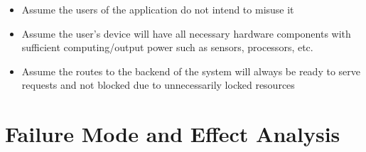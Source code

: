 \documentclass{article}
\begin{document}
\begin{itemize}
    \item Assume the users of the application do not intend to misuse it
    \item Assume the user's device will have all necessary hardware components with sufficient computing/output power such as sensors, processors, etc.
    \item Assume the routes to the backend of the system will always be ready to serve requests and not blocked due to unnecessarily locked resources
\end{itemize}

\section{Failure Mode and Effect Analysis}

\end{document}
